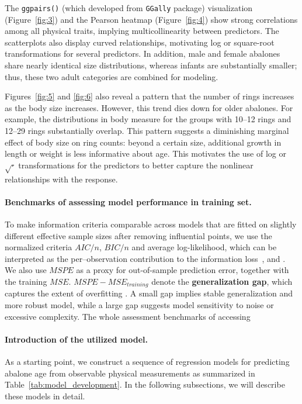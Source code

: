 \documentclass[12pt]{article}
\begin{document}
	The \texttt{ggpairs()} (which developed from \texttt{GGally} package) visualization (Figure~\ref{fig:3}) and the Pearson heatmap (Figure~\ref{fig:4}) show strong correlations among all physical traits, implying multicollinearity between predictors. The scatterplots also display curved relationships, motivating log or square-root transformations for several predictors. In addition, male and female abalones share nearly identical size distributions, whereas infants are substantially smaller; thus, these two adult categories are combined for modeling. 
	
	Figures~\ref{fig:5} and \ref{fig:6} also reveal a pattern that the number of rings increases as the body size increases. However, this trend dies down for older abalones. For example, the distributions in body measure for the groups with 10–12 rings and 12–29 rings substantially overlap. This pattern suggests a diminishing marginal effect of body size on ring counts: beyond a certain size, additional growth in length or weight is less informative about age. This motivates the use of log or $\sqrt{\cdot}$ transformations for the predictors to better capture the nonlinear relationships with the response.
	
	
	\paragraph{Benchmarks of assessing model performance in training set.}
   To make information criteria comparable across models that are fitted on slightly different effective sample sizes after removing influential points, we use the normalized criteria $AIC/n$, $BIC/n$ and average log-likelihood, which can be interpreted as the per--observation contribution to the information loss~\citep{Hilbe2014},  \citep{Cronin1998} and \citep{Feknssa2023}. We also use $MSPE$ as a proxy for out-of-sample prediction error, together with the training $MSE$. $MSPE - MSE_{training}$ denote the \textbf{generalization gap}, which captures the extent of overfitting \citep{vapnik1998statistical}. A small gap implies stable generalization and more robust model, while a large gap suggests model sensitivity to noise or excessive complexity. The whole assessment benchmarks of accessing 
	
	\paragraph{Introduction of the utilized model.} 
	As a starting point, we construct a sequence of regression models for predicting abalone age from observable physical measurements as
	summarized in Table~\ref{tab:model_development}. In the following subsections, we will describe
	these models in detail.
	
\end{document}
